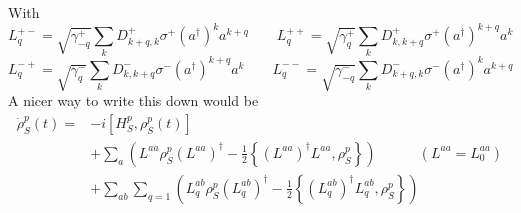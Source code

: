 	With
	\begin{equation*}
		L_q^{+-} =	\sqrt{\gamma_{-q}^+} \sum_k D_{k + q,k}^+ \sigma^+ (a^\dagger)^{k} a^{k+q} \qquad L_q^{++} =	\sqrt{\gamma_{q}^+} \sum_k D_{k,k+q}^+ \sigma^+ (a^\dagger)^{k+q} a^{k}
	\end{equation*}
	\begin{equation*}
		L_q^{-+} =	\sqrt{\gamma_{q}^-} \sum_k D_{k,k+q}^- \sigma^- (a^\dagger)^{k+q} a^{k} \qquad L_q^{--} =	\sqrt{\gamma_{-q}^-} \sum_k D_{k+q,k}^- \sigma^- (a^\dagger)^{k} a^{k+q}
	\end{equation*}
	A nicer way to write this down would be
	\begin{align*}
		\dot{\rho}_S^p(t) = &-i \left[H_S^p,  {\rho}_S^p(t)\right] \\
		&+\sum_a  \left(L^{aa} \rho_S^p \left(L^{aa}\right)^\dagger - \frac{1}{2} \left\{\left(L^{aa}\right)^\dagger L^{aa}, \rho_S^p \right\}\right)  \qquad \quad \left(L^{aa} =	L_0^{aa}\right) \\
		&+\sum_{ab} \sum_{q=1}^{}  \left(L_q^{ab} \rho_S^p \left(L_q^{ab}\right)^\dagger - \frac{1}{2} \left\{\left(L_q^{ab}\right)^\dagger L_q^{ab}, \rho_S^p \right\}\right) \\
	\end{align*}
